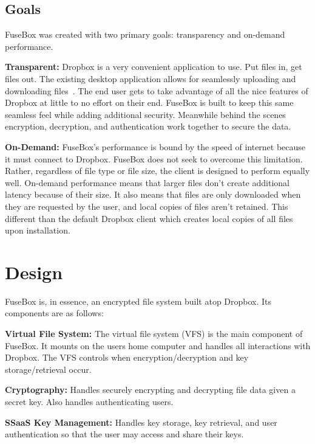 \documentclass[11pt,twocolumn,letterpaper]{article}
\newcommand{\appname}{FuseBox }
\newcommand{\appnameWOspace}{FuseBox}
\begin{document}
\subsection{Goals}
\label{sec:goals}
\appname was created with two primary goals: transparency and
on-demand performance. 
\par {\bf Transparent:} Dropbox is a very convenient application to
use. Put files in, get files out. The existing desktop application
allows for seamlessly uploading and downloading files~\cite{dropboxclient}. The end user
gets to take advantage of all the nice features of Dropbox at little
to no effort on their end. \appname is built to keep this same 
seamless feel while adding additional security. Meanwhile behind the
scenes encryption, decryption, and authentication work together to
secure the data.     
\par {\bf On-Demand:} \appnameWOspace's performance is bound by
the speed of internet because it must connect to Dropbox. 
\appname does not seek to overcome this
limitation. Rather, regardless of file type or file size, the client
is designed to perform equally well. On-demand performance means that
larger files don't create additional latency because of their
size. It also means that files are only downloaded when they are requested
by the user, and local copies of files aren't retained. This different 
than the default Dropbox client which
creates local copies of all files upon installation. 

\section{Design}
\label{sec:design}
\appname is, in essence, an encrypted file system built atop
Dropbox. Its components are as follows:
\par {\bf Virtual File System:} The virtual file system (VFS) is the main component of 
\appnameWOspace. It mounts on the users home computer and handles 
all interactions with Dropbox. The VFS controls when
encryption/decryption and key storage/retrieval occur.   
\par {\bf Cryptography:} Handles securely encrypting and decrypting file data
given a secret key. Also handles authenticating users. 
\par {\bf SSaaS Key Management:} Handles key storage, key retrieval, and user
authentication so that the user may access and share their keys. 
\end{document}

